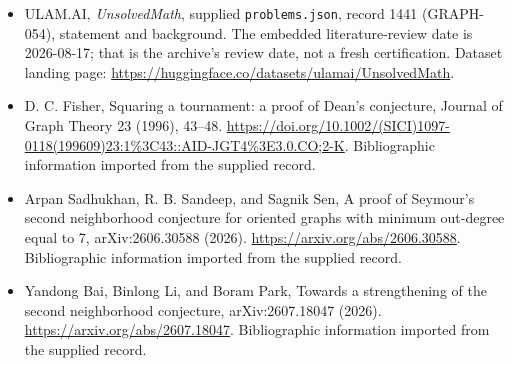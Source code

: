 \documentclass[11pt,a4paper]{article}
\begin{document}
{\small

\begin{itemize}

\item[\hypertarget{source:1441:1}{S1}] ULAM.AI, \emph{UnsolvedMath}, supplied \texttt{problems.json}, record 1441 (GRAPH-054), statement and background. The embedded literature-review date is 2026-08-17; that is the archive’s review date, not a fresh certification. Dataset landing page: \url{https://huggingface.co/datasets/ulamai/UnsolvedMath}.

\item[\hypertarget{source:1441:2}{S2}] D. C. Fisher, Squaring a tournament: a proof of Dean's conjecture, Journal of Graph Theory 23 (1996), 43–48. \url{https://doi.org/10.1002/(SICI)1097-0118(199609)23:1%3C43::AID-JGT4%3E3.0.CO;2-K}. Bibliographic information imported from the supplied record.

\item[\hypertarget{source:1441:3}{S3}] Arpan Sadhukhan, R. B. Sandeep, and Sagnik Sen, A proof of Seymour's second neighborhood conjecture for oriented graphs with minimum out-degree equal to 7, arXiv:2606.30588 (2026). \url{https://arxiv.org/abs/2606.30588}. Bibliographic information imported from the supplied record.

\item[\hypertarget{source:1441:4}{S4}] Yandong Bai, Binlong Li, and Boram Park, Towards a strengthening of the second neighborhood conjecture, arXiv:2607.18047 (2026). \url{https://arxiv.org/abs/2607.18047}. Bibliographic information imported from the supplied record.

\end{itemize}

}

\label{end:1441}
\end{document}
